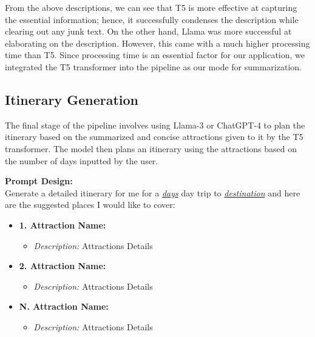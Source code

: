 \documentclass[final,1p,times]{elsarticle}
\begin{document}
    From the above descriptions, we can see that T5 is more effective at capturing the essential information; hence, it successfully condenses the description while clearing out any junk text. On the other hand, Llama was more successful at elaborating on the description. However, this came with a much higher processing time than T5. Since processing time is an essential factor for our application, we integrated the T5 transformer into the pipeline as our mode for summarization.
    
    \subsection{Itinerary Generation}
        The final stage of the pipeline involves using Llama-3 or ChatGPT-4 to plan the itinerary based on the summarized and concise attractions given to it by the T5 transformer. The model then plans an itinerary using the attractions based on the number of days inputted by the user.
        
        \begin{tcolorbox}[boxrule=1pt, left=15pt, right=15pt, top=15pt, bottom=15pt]
        
        \textbf{Prompt Design:} \\
        Generate a detailed itinerary for me for a \underline{\textit{days}} day trip to  \underline{\textit{destination}} and here are the suggested places I would like to cover:
        
          \begin{itemize}
              \item \textbf{1. Attraction Name:}
              \begin{itemize}
                  \item \textit{Description:} Attractions Details
              \end{itemize}
              \item \textbf{2. Attraction Name:}
              \begin{itemize}
                  \item \textit{Description:} Attractions Details
              \end{itemize}
              \item \textbf{N. Attraction Name:}
              \begin{itemize}
                  \item \textit{Description:} Attractions Details
              \end{itemize}
          \end{itemize}
        \end{tcolorbox}
        
\end{document}
